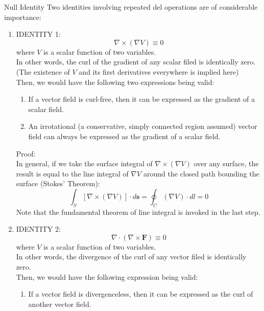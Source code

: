 \documentclass[10pt]{beamer}
\begin{document}
\begin{frame}[allowframebreaks]{Null Identity}
Two identities involving repeated del operations are of considerable importance:
\begin{enumerate}
	\item IDENTITY 1:$$\nabla\times(\nabla V)\equiv 0$$
	where $V$ is a scalar function of two variables.\\
	In other words,
	 {\color{red} the curl of the gradient of any scalar filed is identically zero.} (The existence of $V$ and its first derivatives everywhere is implied here)\\
	 Then, we would have the following two expressions being valid:
	 \begin{enumerate}
	 	\item {\color{blue} If a vector field is curl-free, then it can be expressed as the gradient of a scalar field.}
	 	\item {\color{blue} An irrotational (a conservative, simply connected region assumed) vector field can always be expressed as the gradient of a scalar field.}
	 \end{enumerate}
	 Proof:\\
	 In general, if we take the surface integral of $\nabla\times(\nabla V)$ over any surface, the result is equal to the line integral of $\nabla V$ around the closed path bounding the surface (Stokes' Theorem):
	 $$\int_S[\nabla\times(\nabla V)]\cdot d\mathbf{s} = \oint_C(\nabla V)\cdot dl = 0$$
	 Note that the {\color{red}fundamental theorem of line integral} is invoked in the last step.
	 \item IDENTITY 2:$$\nabla\cdot(\nabla\times \mathbf{F}) \equiv 0$$
	 where $V$ is a scalar function of two variables.\\
	 In other words,
	 	 {\color{red} the divergence of the curl of any vector filed is identically zero.}\\
	 	  Then, we would have the following expression being valid:
	 	  \begin{enumerate}
	 	  	\item {\color{blue}If a vector field is divergenceless, then it can be expressed as the curl of another vector field.}
	 	  \end{enumerate}
\end{enumerate}

\end{frame}
\end{document}
